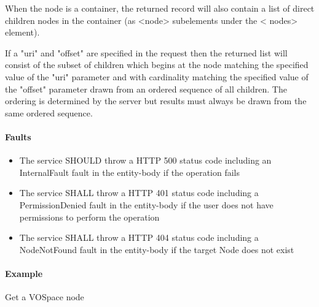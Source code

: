 \documentclass[11pt,a4paper]{ivoa}
\begin{document}
When the node is a container, the returned record will also contain a list of direct children nodes in the container (as <node> subelements under the < nodes> element).

If a "uri" and "offset" are specified in the request then the returned list will consist of the subset of children which begins at the node matching the specified value of the "uri" parameter and with cardinality matching the specified value of the "offset" parameter drawn from an ordered sequence of all children. The ordering is determined by the server but results must always be drawn from the same ordered sequence.

\paragraph{Faults}
\begin{itemize}
    \item The service SHOULD throw a HTTP 500 status code including an InternalFault fault in the entity-body if the operation fails
    \item The service SHALL throw a HTTP 401 status code including a PermissionDenied fault in the entity-body if the user does not have permissions to perform the operation
    \item The service SHALL throw a HTTP 404 status code including a NodeNotFound fault in the entity-body if the target Node does not exist
\end{itemize}

\paragraph{Example}
Get a VOSpace node
\end{document}
